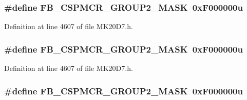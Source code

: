 \subsubsection[{\texorpdfstring{F\+B\+\_\+\+C\+S\+P\+M\+C\+R\+\_\+\+G\+R\+O\+U\+P2\+\_\+\+M\+A\+SK}{FB_CSPMCR_GROUP2_MASK}}]{\setlength{\rightskip}{0pt plus 5cm}\#define F\+B\+\_\+\+C\+S\+P\+M\+C\+R\+\_\+\+G\+R\+O\+U\+P2\+\_\+\+M\+A\+SK~0x\+F000000u}\hypertarget{group___f_b___register___masks_ga594596b281baba23e03cb37fbf0a05db}{}\label{group___f_b___register___masks_ga594596b281baba23e03cb37fbf0a05db}


Definition at line 4607 of file M\+K20\+D7.\+h.

\subsubsection[{\texorpdfstring{F\+B\+\_\+\+C\+S\+P\+M\+C\+R\+\_\+\+G\+R\+O\+U\+P2\+\_\+\+M\+A\+SK}{FB_CSPMCR_GROUP2_MASK}}]{\setlength{\rightskip}{0pt plus 5cm}\#define F\+B\+\_\+\+C\+S\+P\+M\+C\+R\+\_\+\+G\+R\+O\+U\+P2\+\_\+\+M\+A\+SK~0x\+F000000u}\hypertarget{group___f_b___register___masks_ga594596b281baba23e03cb37fbf0a05db}{}\label{group___f_b___register___masks_ga594596b281baba23e03cb37fbf0a05db}


Definition at line 4607 of file M\+K20\+D7.\+h.

\subsubsection[{\texorpdfstring{F\+B\+\_\+\+C\+S\+P\+M\+C\+R\+\_\+\+G\+R\+O\+U\+P2\+\_\+\+M\+A\+SK}{FB_CSPMCR_GROUP2_MASK}}]{\setlength{\rightskip}{0pt plus 5cm}\#define F\+B\+\_\+\+C\+S\+P\+M\+C\+R\+\_\+\+G\+R\+O\+U\+P2\+\_\+\+M\+A\+SK~0x\+F000000u}\hypertarget{group___f_b___register___masks_ga594596b281baba23e03cb37fbf0a05db}{}\label{group___f_b___register___masks_ga594596b281baba23e03cb37fbf0a05db}


